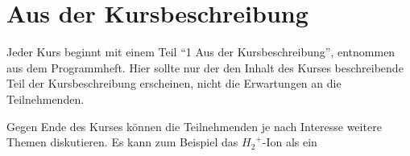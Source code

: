 \section{Aus der Kursbeschreibung}

Jeder Kurs beginnt mit einem Teil "`1 Aus der Kursbeschreibung"', entnommen aus dem Programmheft.
Hier sollte nur der den Inhalt des Kurses beschreibende
Teil der Kursbeschreibung erscheinen, nicht
die Erwartungen an die Teilnehmenden.




Gegen Ende des Kurses können die Teilnehmenden je nach Interesse weitere Themen diskutieren. Es kann zum Beispiel das ${H_2}^+$-Ion als ein